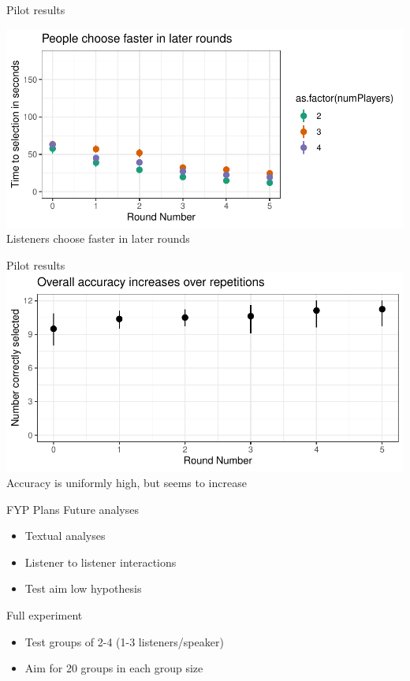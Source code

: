 \documentclass[12pt, xcolor=beamer,table,usenames,dvipsnames, ignorenonframetext, ngerman,t]{beamer}
\begin{document}
\begin{frame}{Pilot results}

	\includegraphics[width=\textwidth]{images/time.pdf}
	Listeners choose faster in later rounds
	
\end{frame}

\begin{frame}{Pilot results}
	\includegraphics[width=\textwidth]{images/accuracy.pdf}
	Accuracy is uniformly high, but seems to increase
\end{frame}

\begin{frame}{FYP Plans}
	Future analyses \pause
	\begin{itemize}
		\item Textual analyses \pause
		\item Listener to listener interactions \pause
		\item Test aim low hypothesis \pause
	\end{itemize}

Full experiment
\begin{itemize}
	\item Test groups of 2-4 (1-3 listeners/speaker)
	\item Aim for 20 groups in each group size
\end{itemize}
\end{frame}
\end{document}
